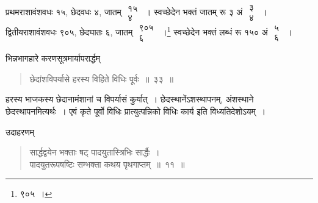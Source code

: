 \documentclass[10pt, openany]{book}
\begin{document}
{प्रथमराशावंशवधः १५, छेदवधः ४, जातम् $\begin{matrix}

\mbox{{१५}}\\

\mbox{{४}}

\end{matrix}$~। स्वच्छेदेन भक्तं जातम्
रू ३ अं $\begin{matrix}

\mbox{{३}}\\

\mbox{{४}}

\end{matrix}$~। द्वितीयराशावंशवधः ९०५, छेदघातः ६, जातम् $\begin{matrix}

\mbox{{९०५}}\\

\mbox{{६}}

\end{matrix}$~।\renewcommand{\thefootnote}{\s ४}\footnote{\s ९०५~।} स्वच्छेदेन भक्तं
लब्धं रू १५० अं $\begin{matrix}

\mbox{{५}}\\

\mbox{{६}}

\end{matrix}$~।}
\vspace{3mm}

{भिन्नभागहारे करणसूत्रमार्यापरार्द्धम्\textemdash}

 \label{33}
\begin{quote}
{\bs छेदांशविपर्यासे हरस्य विहिते विधिः पूर्वः~॥~३३~॥}\end{quote}

{हरस्य भाजकस्य छेदानामंशानां च विपर्यासं कुर्यात्~। छेदस्थानेंऽशस्थापनम्, अंशस्थाने छेदस्थापनमित्यर्थः~। एवं कृते पूर्वो विधिः प्रात्युत्पन्निको विधिः कार्य इति विध्यतिदेशोऽयम्~।}
\vspace{3mm}

{उदाहरणम्\textemdash}

\begin{quote}
{\eg  सार्द्धद्वयेन भक्ताः षट् पादयुतास्त्रिभिः सार्द्धैः~। \\
 पादयुतरूपषष्टिः सम्भक्ता कथय पृथगाप्तम्~॥~११~॥}\end{quote}

\end{document}
